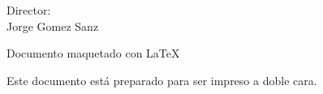 {\raggedleft
Director:\\
   \vspace{ 1cm}
Jorge Gomez Sanz\\

}



\clearpage

\thispagestyle{empty}

\begin{center}

{ Documento maquetado con \LaTeX{} }

\vfill
{Este documento está preparado para ser impreso a doble cara.}

\end{center}

